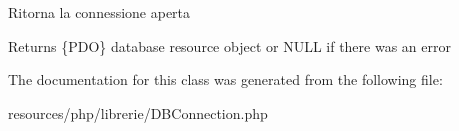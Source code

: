 Ritorna la connessione aperta  \begin{DoxyReturn}{Returns}
\{P\+DO\} database resource object or N\+U\+LL if there was an error 
\end{DoxyReturn}


The documentation for this class was generated from the following file\+:\begin{DoxyCompactItemize}
\item 
resources/php/librerie/D\+B\+Connection.\+php\end{DoxyCompactItemize}
